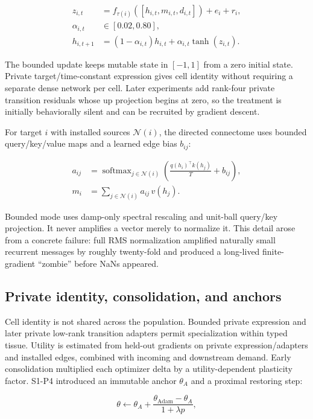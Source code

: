 \documentclass[11pt]{article}
\begin{document}
\begin{align}
  z_{i,t} &= f_{\tau(i)}\!\left([h_{i,t},m_{i,t},d_{i,t}]\right) + e_i + r_i,\\
  \alpha_{i,t} &\in [0.02,0.80],\\
  h_{i,t+1} &= (1-\alpha_{i,t})h_{i,t} + \alpha_{i,t}\tanh(z_{i,t}).
\end{align}

The bounded update keeps mutable state in $[-1,1]$ from a zero initial state. Private
target/time-constant expression gives cell identity without requiring a separate dense
network per cell. Later experiments add rank-four private transition residuals whose up
projection begins at zero, so the treatment is initially behaviorally silent and can be
recruited by gradient descent.

For target $i$ with installed sources $\mathcal{N}(i)$, the directed connectome uses
bounded query/key/value maps and a learned edge bias $b_{ij}$:

\begin{align}
  a_{ij} &= \operatorname{softmax}_{j\in\mathcal{N}(i)}
    \left(\frac{q(h_i)^\top k(h_j)}{T}+b_{ij}\right),\\
  m_i &= \sum_{j\in\mathcal{N}(i)} a_{ij}\,v(h_j).
\end{align}

Bounded mode uses damp-only spectral rescaling and unit-ball query/key projection. It
never amplifies a vector merely to normalize it. This detail arose from a concrete
failure: full RMS normalization amplified naturally small recurrent messages by roughly
twenty-fold and produced a long-lived finite-gradient ``zombie'' before NaNs appeared.

\subsection{Private identity, consolidation, and anchors}

Cell identity is not shared across the population. Bounded private expression and later
private low-rank transition adapters permit specialization within typed tissue. Utility
is estimated from held-out gradients on private expression/adapters and installed edges,
combined with incoming and downstream demand. Early consolidation multiplied each
optimizer delta by a utility-dependent plasticity factor. S1-P4 introduced an immutable
anchor $\theta_A$ and a proximal restoring step:

\begin{equation}
  \theta \leftarrow \theta_A +
  \frac{\theta_{\mathrm{Adam}}-\theta_A}{1+\lambda p},
\end{equation}
\end{document}

